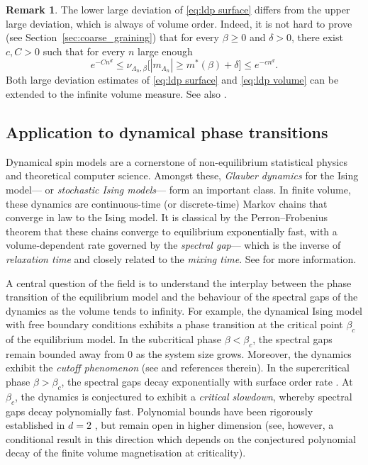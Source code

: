 \documentclass[11pt,a4paper]{article}
\theoremstyle{definition}
\newtheorem{remark}[theorem]{Remark}
\numberwithin{equation}{section}
\begin{document}
\begin{remark} \label{rem: vol order}
The lower large deviation of \eqref{eq:ldp surface} differs from the upper large deviation, which is always of volume order. Indeed, it is not hard to prove (see Section~\textup{\ref{sec:coarse_graining}}) that for every $\beta\geq0$ and $\delta>0$, there exist $c,C>0$ such that for every $n$ large enough
\begin{equation}\label{eq:ldp volume}
     e^{-Cn^d}\leq \nu_{\Lambda_n,\beta}\Big[ |m_{\Lambda_n}|\geq m^*(\beta)+\delta \Big]\leq e^{-cn^d}.
     \end{equation}
Both large deviation estimates of \eqref{eq:ldp surface} and \eqref{eq:ldp volume} can be extended to the infinite volume measure. See also \cite{comets1986grandes, olla1988large}.
\end{remark}

\subsection{Application to dynamical phase transitions}

Dynamical spin models are a cornerstone of non-equilibrium statistical physics and theoretical computer science. Amongst these, \emph{Glauber dynamics} for the Ising model--- or \emph{stochastic Ising models}--- form an important class.
In finite volume, these dynamics are continuous-time (or discrete-time) Markov chains that converge in law to the Ising model. It is classical by the Perron--Frobenius theorem that these chains converge to equilibrium exponentially fast, with a volume-dependent rate governed by the \emph{spectral gap}--- which is the inverse of \emph{relaxation time} and closely related to the \emph{mixing time}. See \cite{martinelli99} for more information. 

A central question of the field is to understand the interplay between the phase transition of the equilibrium model and the behaviour of the spectral gaps of the dynamics as the volume tends to infinity. For example, the dynamical Ising model with free boundary conditions exhibits a phase transition at the critical point $\beta_c$ of the equilibrium model. In the subcritical phase $\beta<\beta_c$, the spectral gaps remain bounded away from $0$ as the system size grows. Moreover, the dynamics exhibit the \emph{cutoff phenomenon} (see \cite{LubSly13,LubSly16} and references therein). In the supercritical phase $\beta > \beta_c$, the spectral gaps decay exponentially with surface order rate \cite{cesi1996two}. At $\beta_c$, the dynamics is conjectured to exhibit a \emph{critical slowdown}, whereby spectral gaps decay polynomially fast. Polynomial bounds have been rigorously established in $d=2$ \cite{LubSly12}, but remain open in higher dimension (see, however, a conditional result in this direction \cite{Hu2025} which depends on the conjectured polynomial decay of the finite volume magnetisation at criticality).
\end{document}
